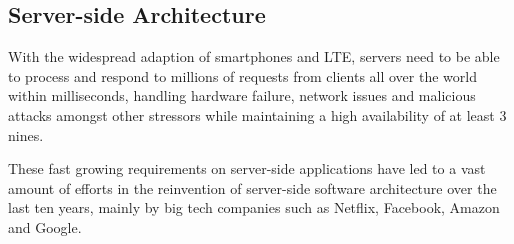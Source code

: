 \subsection{Server-side Architecture}
\label{ssec:ServerSideArchitecture}

With the widespread adaption of smartphones and LTE, servers need to be able to process and respond to millions of requests from clients all over the world within milliseconds, handling hardware failure, network issues and malicious attacks amongst other stressors while maintaining a high availability of at least 3 nines.

These fast growing requirements on server-side applications have led to a vast amount of efforts in the reinvention of server-side software architecture over the last ten years, mainly by big tech companies such as Netflix, Facebook, Amazon and Google.

%






